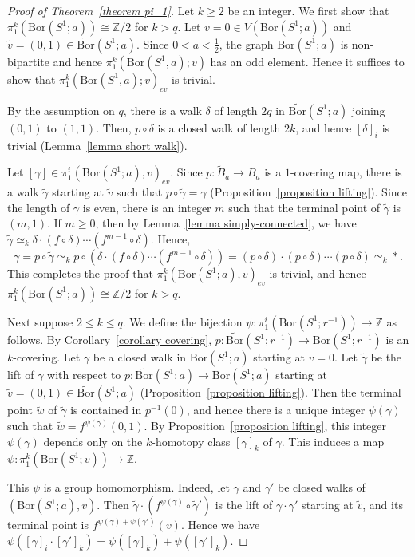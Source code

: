 \documentclass[11pt, amsfonts]{amsart}
\numberwithin{equation}{section}
\theoremstyle{definition}
\theoremstyle{remark}
\newcommand{\ZZ}{\mathbb{Z}}
\newcommand{\tv}{\tilde{v}}
\newcommand{\tw}{\tilde{w}}
\newcommand{\tB}{\widetilde{B}}
\newcommand{\Bor}{\mathrm{Bor}}
\newcommand{\tBor}{\widetilde{\mathrm{Bor}}}
\newcommand{\tgamma}{\tilde{\gamma}}
\begin{document}
\begin{proof}[Proof of Theorem~\ref{theorem pi_1}]
Let $k \ge 2$ be an integer. We first show that $\pi_1^k(\Bor(S^1; a)) \cong \ZZ / 2$ for $k > q$. Let $v = 0 \in V(\Bor(S^1; a))$ and $\tv = (0, 1) \in \tBor(S^1; a)$. Since $0 < a < \frac{1}{2}$, the graph $\Bor(S^1; a)$ is non-bipartite and hence $\pi_1^k(\Bor(S^1, a); v)$ has an odd element. Hence it suffices to show that $\pi_1^k(\Bor(S^1, a); v)_{ev}$ is trivial.

By the assumption on $q$, there is a walk $\delta$ of length $2q$ in $\tBor(S^1; a)$ joining $(0,1)$ to $(1,1)$. Then, $p \circ \delta$ is a closed walk of length $2k$, and hence $[\delta]_i$ is trivial (Lemma~\ref{lemma short walk}).

Let $[\gamma] \in \pi_1^i(\Bor(S^1; a), v)_{ev}$. Since $p \colon \tB_a \to B_a$ is a $1$-covering map, there is a walk $\tgamma$ starting at $\tv$ such that $p \circ \tgamma = \gamma$ (Proposition~\ref{proposition lifting}). Since the length of $\gamma$ is even, there is an integer $m$ such that the terminal point of $\tgamma$ is $(m, 1)$.
If $m \ge 0$, then by Lemma~\ref{lemma simply-connected}, we have $\tgamma \simeq_k \delta \cdot (f \circ \delta) \cdots (f^{m-1} \circ \delta)$. Hence,
\[ \gamma = p \circ \tgamma \simeq_k p \circ \left( \delta \cdot (f \circ \delta) \cdots (f^{m-1} \circ \delta) \right) = (p \circ \delta) \cdot (p \circ \delta) \cdots (p \circ \delta) \simeq_k *.\]
This completes the proof that $\pi_1^k(\Bor(S^1; a), v)_{ev}$ is trivial, and hence $\pi_1^k(\Bor(S^1; a)) \cong \ZZ / 2$ for $k > q$.

Next suppose $2 \le k \le q$. We define the bijection $\psi \colon \pi_1^i(\Bor(S^1 ; r^{-1})) \to \ZZ$ as follows. By Corollary~\ref{corollary covering}, $p \colon \tBor(S^1; r^{-1}) \to \Bor(S^1; r^{-1})$ is an $k$-covering.
Let $\gamma$ be a closed walk in $\Bor(S^1;a)$ starting at $v = 0$.
Let $\tgamma$ be the lift of $\gamma$ with respect to $p \colon \tBor(S^1; a) \to \Bor(S^1; a)$ starting at $\tv = (0,1) \in \tBor(S^1; a)$ (Proposition~\ref{proposition lifting}). Then the terminal point $\tw$ of $\tgamma$ is contained in $p^{-1}(0)$, and hence there is a unique integer $\psi(\gamma)$ such that $\tw = f^{\psi(\gamma)}(0,1)$. By Proposition~\ref{proposition lifting}, this integer $\psi(\gamma)$ depends only on the $k$-homotopy class $[\gamma]_k$ of $\gamma$. This induces a map $\psi \colon \pi_1^k(\Bor(S^1; v)) \to \ZZ$.

This $\psi$ is a group homomorphism. Indeed, let $\gamma$ and $\gamma'$ be closed walks of $(\Bor(S^1 ; a), v)$. Then $\tgamma \cdot (f^{\psi(\gamma)} \circ \tgamma')$ is the lift of $\gamma \cdot \gamma'$ starting at $\tv$, and its terminal point is $f^{\psi(\gamma) + \psi(\gamma')}(v)$. Hence we have $\psi ([\gamma]_i \cdot [\gamma']_k) = \psi([\gamma]_k) + \psi([\gamma']_k)$.


\end{proof}
\end{document}
